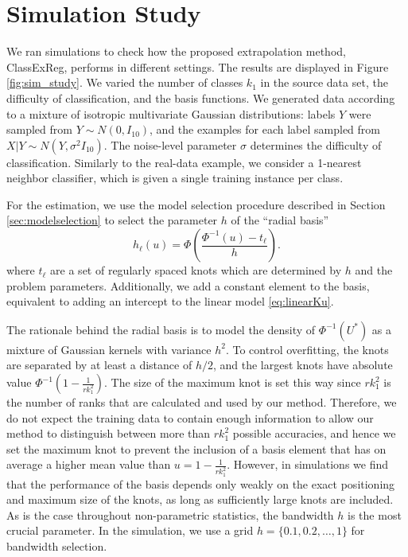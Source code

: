 \documentclass[twoside,11pt]{article}
\begin{document}
\section{Simulation Study}\label{sec:simulation_study}

We ran simulations to check how the proposed extrapolation method, ClassExReg,
performs in different settings.  The results are displayed in Figure
\ref{fig:sim_study}.
We varied the number of classes $k_1$ in the
source data set, the difficulty of classification, and the basis
functions. We generated data according to a mixture of isotropic
multivariate Gaussian distributions: labels $Y$ were sampled from $Y
\sim N(0, I_{10})$, and the examples for each label sampled from $X|Y
\sim N(Y, \sigma^2 I_{10})$. The noise-level parameter $\sigma$
determines the difficulty of classification. Similarly to the
real-data example, we consider a 1-nearest neighbor classifier, which
is given a single training instance per class.

For the estimation, we use the model selection procedure described
in Section \ref{sec:modelselection} to select the parameter $h$ of the
``radial basis''
\[
h_\ell(u) = \Phi\left(\frac{\Phi^{-1}(u) - t_\ell}{h}\right).
\]
where $t_\ell$ are a set of regularly spaced knots which are
determined by $h$ and the problem parameters. Additionally, we add a
constant element to the basis, equivalent to adding an intercept to
the linear model \eqref{eq:linearKu}.

The rationale behind the radial basis is to model the density of
$\Phi^{-1}(U^*)$ as a mixture of Gaussian kernels with variance $h^2$.
To control overfitting, the knots are separated by at least a distance
of $h/2$, and the largest knots have absolute value $\Phi^{-1}(1 -
\frac{1}{rk_1^2}).$ The size of the maximum knot is set this way since
$rk_1^2$ is the number of ranks that are calculated and used by our
method.  Therefore, we do not expect the training data to contain
enough information to allow our method to distinguish between more
than $rk_1^2$ possible accuracies, and hence we set the maximum knot
to prevent the inclusion of a basis element that has on average a
higher mean value than $u = 1-\frac{1}{rk_1^2}$.  However, in
simulations we find that the performance of the basis depends only
weakly on the exact positioning and maximum size of the knots, as long
as sufficiently large knots are included. As is the case throughout non-parametric statistics, the bandwidth $h$ is the
most crucial parameter.  In the simulation, we use a grid $h = \{0.1,
0.2, \hdots, 1\}$ for bandwidth selection.
\end{document}

